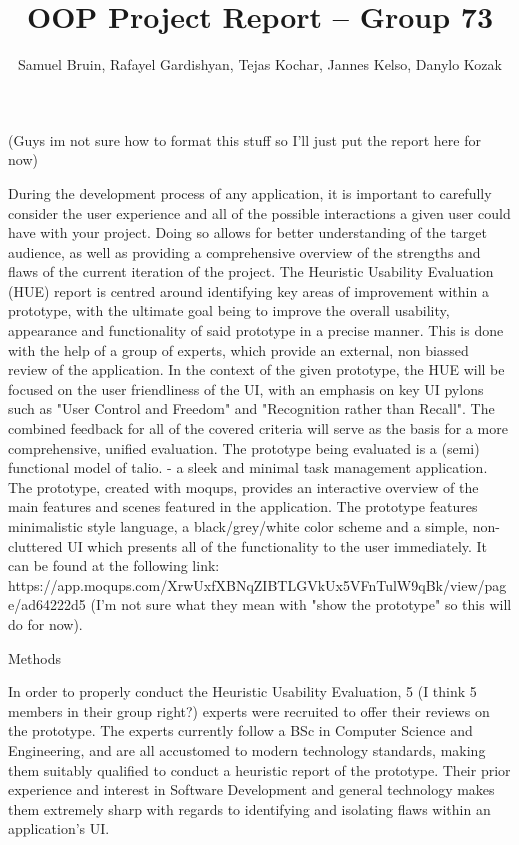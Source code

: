 \documentclass[sigconf]{acmart}
\title{OOP Project Report -- Group 73}
\author{Samuel Bruin, Rafayel Gardishyan, Tejas Kochar, Jannes Kelso, Danylo Kozak}
\begin{document}
\begin{abstract}

\end{abstract}

\maketitle

 (Guys im not sure how to format this stuff so I'll just put the report here for now)

	During the development process of any application, it is important to carefully consider the user experience and all of the possible interactions a given user could have with your project. Doing so allows for better understanding of the target audience, as well as providing a comprehensive overview of the strengths and flaws of the current iteration of the project. The Heuristic Usability Evaluation (HUE) report is centred around identifying key areas of improvement within a prototype, with the ultimate goal being to improve the overall usability, appearance and functionality of said prototype in a precise manner. This is done with the help of a group of experts, which provide an external, non biassed review of the application. In the context of the given prototype, the HUE will be focused on the user friendliness of the UI, with an emphasis on key UI pylons such as "User Control and Freedom" and "Recognition rather than Recall". The combined feedback for all of the covered criteria will serve as the basis for a more comprehensive, unified evaluation.
	The prototype being evaluated is a (semi) functional model of talio. - a sleek and minimal task management application. The prototype, created with moqups, provides an interactive overview of the main features and scenes featured in the application. The prototype features minimalistic style language, a black/grey/white color scheme and a simple, non-cluttered UI which presents all of the functionality to the user immediately. It can be found at the following link: https://app.moqups.com/XrwUxfXBNqZIBTLGVkUx5VFnTulW9qBk/view/page/ad64222d5 (I'm not sure what they mean with "show the prototype" so this will do for now).

Methods

	In order to properly conduct the Heuristic Usability Evaluation, 5 (I think 5 members in their group right?) experts were recruited to offer their reviews on the prototype. The experts currently follow a BSc in Computer Science and Engineering, and are all accustomed to modern technology standards, making them suitably qualified to conduct a heuristic report of the prototype. Their prior experience and interest in Software Development and general technology makes them extremely sharp with regards to identifying and isolating flaws within an application's UI.
\end{document}
